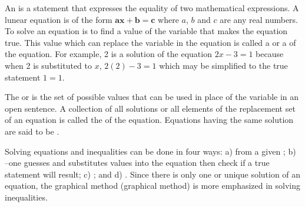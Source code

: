 An  is a statement that expresses the equality of two mathematical expressions. A lunear
equation is of the form $\mathbf{ax + b = c}$ where $a$, $b$ and $c$ are any real numbers. To solve an equation is to
find a value of the variable that makes the equation true. This value which can replace the variable in
the equation is called a  or a  of the equation. For example, 2 is a solution of the
equation $2x - 3 = 1$ because when 2 is substituted to $x$, $2(2) - 3 = 1$ which may be simplified to the
true statement $1 = 1$.

The  or  is the set of possible values that can be used in place of the variable
in an open sentence. A collection of all solutions or all elements of the replacement set of an
equation is called the  of the equation. Equations having the same solution are said to be
.

Solving equations and inequalities can be done in four ways: a) from a given ;
b) --one guesses and substitutes values into the equation then check if a true
statement will result; c) ; and d) . Since there is only one or unique
solution of an equation, the graphical method (graphical method) is more emphasized in solving
inequalities.


